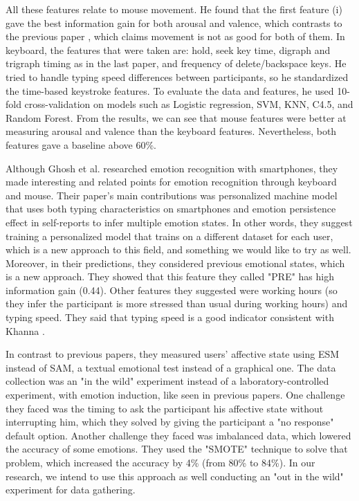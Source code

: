 \documentclass[../main.tex]{subfiles}
\begin{document}
All these features relate to mouse movement. He found that the first feature (i) gave the 
best information gain for both arousal and valence, which contrasts to the previous paper \cite{An_Evaluation_Of_Mouse_And_Keyboard_Interaction}, 
which claims movement is not as good for both of them. 
In keyboard, the features that were taken are: hold, seek key time, digraph and trigraph timing as in 
the last paper, and frequency of delete/backspace keys. He tried to handle typing speed differences 
between participants, so he standardized the time-based keystroke features. 
To evaluate the data and features, he used 10-fold cross-validation on models such as 
Logistic regression, SVM, KNN, C4.5, and Random Forest. 
From the results, we can see that mouse features were better at measuring arousal and valence 
than the keyboard features. Nevertheless, both features gave a baseline above 60\%.
\par

Although Ghosh et al. \cite{Ghosh} researched emotion recognition with smartphones, 
they made interesting and related points for emotion recognition through keyboard and mouse. 
Their paper's main contributions was personalized machine model that uses both typing 
characteristics on smartphones and emotion persistence effect in self-reports to infer 
multiple emotion states. In other words, they suggest training a personalized model that 
trains on a different dataset for each user, which is a new approach to this field, 
and something we would like to try as well. Moreover, in their predictions, they considered previous 
emotional states, which is a new approach. They showed that this feature they called "PRE" has 
high information gain (0.44). Other features they suggested were working hours 
(so they infer the participant is more stressed than usual during working hours) and typing speed. 
They said that typing speed is a good indicator consistent with Khanna \cite{Khanna}.
\par

In contrast to previous papers, they measured users' affective state using ESM instead of SAM, 
a textual emotional test instead of a graphical one. The data collection was an "in the wild" 
experiment instead of a laboratory-controlled experiment, with emotion induction, like seen in 
previous papers. One challenge they faced was the timing to ask the participant his affective 
state without interrupting him, which they solved by giving the participant a "no response" 
default option. Another challenge they faced was imbalanced data, which lowered the accuracy of 
some emotions. They used the "SMOTE" technique to solve that problem, which increased the 
accuracy by 4\% (from 80\% to 84\%).
In our research, we intend to use this approach as well conducting an "out in the wild" experiment for data gathering.
\end{document}

